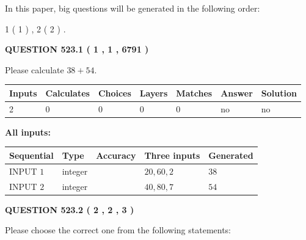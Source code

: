 \documentclass[12pt]{article}
\begin{document}
\vspace{0.2in}
   
In this paper, big questions will be generated in the following order: 
   
   
   1 ( 1 )
 ,
   2 ( 2 )
 .
  
\vspace{0.2in}
  
{\textbf{\Large{QUESTION
523.1 
 ( 1 , 1 , 6791 )
}}}
  
  
 
Please calculate $ %
38 +  %
54 $.
 
 
   
   
   
   
\noindent\begin{tabular}{|l|l|l|l|l|l|l|}
 \hline
Inputs & Calculates & Choices & Layers & Matches & Answer & Solution \\ \hline
 2  & 
 0  & 
 0
  & 
 0  & 
 0  & 
  no & 
  no 
  \\ \hline
 \end{tabular}
   
   
   
   
\noindent{}
   
   
   
   
\noindent\vspace{0.1in}\hspace{-0.08in} {\textbf{\Large{All inputs: }}}
   
   
  
  
\noindent\begin{tabular}{|l|l|l|l|l|}
\hline
 Sequential & Type & Accuracy & Three inputs & Generated \\ 
\hline
 
 
  INPUT $  1 $ & integer &  & $
 20
 , 
 60
 , 
 2
 $ & $ 38 $ 
 \\  \hline  
 
 
  INPUT $  2 $ & integer &  & $
 40
 , 
 80
 , 
 7
 $ & $ 54 $ 
 \\  \hline  
 \end{tabular}
   
   
  
\vspace{0.2in}
  
{\textbf{\Large{QUESTION
523.2 
 ( 2 , 2 , 3 )
}}}
  
  
Please choose the correct one from the following statements:
 
\end{document}
